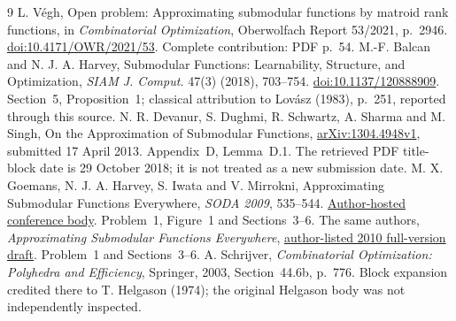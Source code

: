\documentclass[11pt]{article}
\begin{document}
\begin{thebibliography}{9}
 L. V\'egh, Open problem: Approximating submodular functions by matroid rank functions, in \emph{Combinatorial Optimization}, Oberwolfach Report 53/2021, p.~2946. \href{https://doi.org/10.4171/OWR/2021/53}{doi:10.4171/OWR/2021/53}. Complete contribution: PDF p.~54.
 M.-F. Balcan and N. J. A. Harvey, Submodular Functions: Learnability, Structure, and Optimization, \emph{SIAM J. Comput.} 47(3) (2018), 703--754. \href{https://doi.org/10.1137/120888909}{doi:10.1137/120888909}. Section~5, Proposition~1; classical attribution to Lov\'asz (1983), p.~251, reported through this source.
 N. R. Devanur, S. Dughmi, R. Schwartz, A. Sharma and M. Singh, On the Approximation of Submodular Functions, \href{https://arxiv.org/abs/1304.4948}{arXiv:1304.4948v1}, submitted 17 April 2013. Appendix~D, Lemma~D.1. The retrieved PDF title-block date is 29 October 2018; it is not treated as a new submission date.
 M. X. Goemans, N. J. A. Harvey, S. Iwata and V. Mirrokni, Approximating Submodular Functions Everywhere, \emph{SODA 2009}, 535--544. \href{https://www.cs.ubc.ca/~nickhar/papers/SubmodularEverywhere/SubmodularEverywhere.pdf}{Author-hosted conference body}. Problem~1, Figure~1 and Sections~3--6.
 The same authors, \emph{Approximating Submodular Functions Everywhere}, \href{https://www.cs.ubc.ca/~nickhar/papers/SubmodularEverywhere/SubmodularEverywhereFull.pdf}{author-listed 2010 full-version draft}. Problem~1 and Sections~3--6.
 A. Schrijver, \emph{Combinatorial Optimization: Polyhedra and Efficiency}, Springer, 2003, Section~44.6b, p.~776. Block expansion credited there to T. Helgason (1974); the original Helgason body was not independently inspected.
\end{thebibliography}
\end{document}
